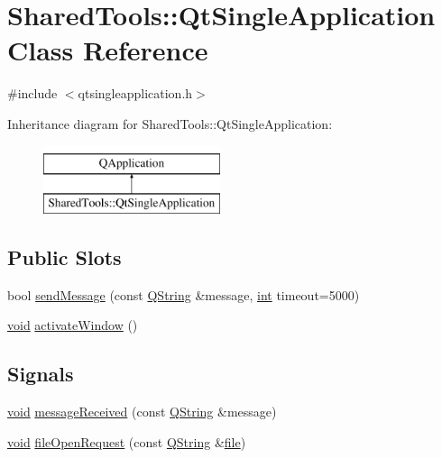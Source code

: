 \hypertarget{class_shared_tools_1_1_qt_single_application}{\section{Shared\-Tools\-:\-:Qt\-Single\-Application Class Reference}
\label{class_shared_tools_1_1_qt_single_application}
}


{\ttfamily \#include $<$qtsingleapplication.\-h$>$}

Inheritance diagram for Shared\-Tools\-:\-:Qt\-Single\-Application\-:\begin{figure}[H]
\begin{center}
\leavevmode
\includegraphics[height=2.000000cm]{class_shared_tools_1_1_qt_single_application}
\end{center}
\end{figure}
\subsection*{Public Slots}
\begin{DoxyCompactItemize}
\item 
bool \hyperlink{class_shared_tools_1_1_qt_single_application_a02b98de033a9eede513891c99d0e3fd0}{send\-Message} (const \hyperlink{group___u_a_v_objects_plugin_gab9d252f49c333c94a72f97ce3105a32d}{Q\-String} \&message, \hyperlink{ioapi_8h_a787fa3cf048117ba7123753c1e74fcd6}{int} timeout=5000)
\item 
\hyperlink{group___u_a_v_objects_plugin_ga444cf2ff3f0ecbe028adce838d373f5c}{void} \hyperlink{class_shared_tools_1_1_qt_single_application_a0e005a0421f59c3751b768f3212c2305}{activate\-Window} ()
\end{DoxyCompactItemize}
\subsection*{Signals}
\begin{DoxyCompactItemize}
\item 
\hyperlink{group___u_a_v_objects_plugin_ga444cf2ff3f0ecbe028adce838d373f5c}{void} \hyperlink{class_shared_tools_1_1_qt_single_application_abed6d7b36742052ddd66624fffa8b513}{message\-Received} (const \hyperlink{group___u_a_v_objects_plugin_gab9d252f49c333c94a72f97ce3105a32d}{Q\-String} \&message)
\item 
\hyperlink{group___u_a_v_objects_plugin_ga444cf2ff3f0ecbe028adce838d373f5c}{void} \hyperlink{class_shared_tools_1_1_qt_single_application_abbb3ce3a832f169b98850c5b65d7ec36}{file\-Open\-Request} (const \hyperlink{group___u_a_v_objects_plugin_gab9d252f49c333c94a72f97ce3105a32d}{Q\-String} \&\hyperlink{uavobjecttemplate_8m_a97c04efa65bcf0928abf9260bc5cbf46}{file})
\end{DoxyCompactItemize}
